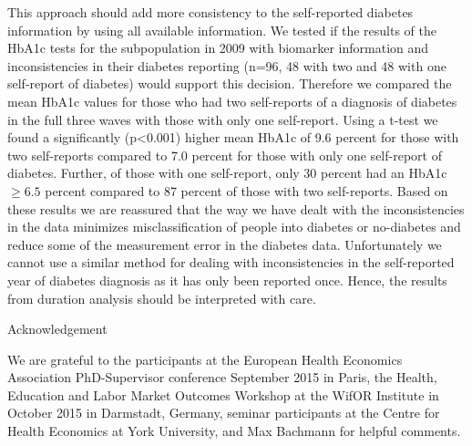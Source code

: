 \documentclass[12pt,english,british]{article}
\begin{document}
\begin{appendix}
This approach should add more consistency to the self-reported diabetes
information by using all available information. We tested if the results
of the \ac{HbA1c} tests for the subpopulation in 2009 with biomarker
information and inconsistencies in their diabetes reporting (n=96,
48 with two and 48 with one self-report of diabetes) would support
this decision. Therefore we compared the mean \ac{HbA1c} values for those
who had two self-reports of a diagnosis of diabetes in the full three
waves with those with only one self-report. Using a t-test we found
a significantly (p<0.001) higher mean \ac{HbA1c} of 9.6 percent
for those with two self-reports compared to 7.0 percent for those
with only one self-report of diabetes. Further, of those with one
self-report, only 30 percent had an \ac{HbA1c}$\geq6.5$ percent
compared to 87 percent of those with two self-reports. Based on these results we are reassured that the way we have dealt with the inconsistencies in the data
minimizes misclassification of people into diabetes or no-diabetes
and reduce some of the measurement error in the diabetes data. Unfortunately we cannot use a similar method for dealing with inconsistencies
in the self-reported year of diabetes diagnosis as it has only been reported once. Hence, the results from duration analysis should be interpreted with care.

\end{appendix}

Acknowledgement

We are grateful to the participants at the European Health Economics Association PhD-Supervisor conference September 2015 in Paris, the Health, Education and Labor Market Outcomes Workshop at the WifOR Institute in October 2015 in Darmstadt, Germany, seminar participants at the Centre for Health Economics at York University, and Max Bachmann for helpful comments.


\noindent  

%


\end{document}
